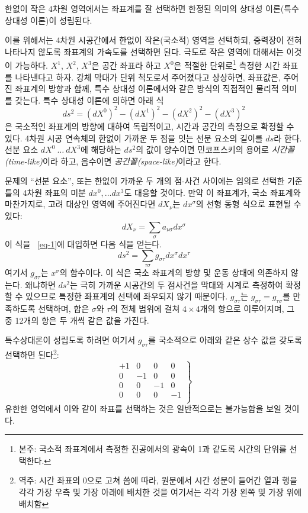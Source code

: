 한없이 작은 4차원 영역에서는 좌표계를 잘 선택하면 한정된 의미의 상대성 이론(특수 상대성 이론)이 성립된다.

이를 위해서는 4차원 시공간에서 한\-없이 작은(국소적) 영역을 선택하되, 중력장이 전혀 나타나지 않도록 좌표계의 가속도를 선택하면 된다. 극도로 작은 영역에 대해서는 이것이 가능하다. $X^1$, $X^2$, $X^3$은 공간 좌표라 하고 $X^0$은 적절한 단위로\footnote{본주: 국소적 좌표계에서 측정한 진공에서의 광속이 1과 같도록 시간의 단위를 선택한다.}  측정한 시간 좌표를 나타낸다고 하자. 강체 막대가 단위 척도로서 주어졌다고 상상하면, 좌표값은, 주어진 좌표계의 방향과 함께, 특수 상대성 이론에서와 같은 방식의 직접적인 물리적 의미를 갖는다. 특수 상대성 이론에 의하면 아래 식
\begin{equation} \label{eq-1}
	ds^2 = \left(dX^0\right)^2 - \left(dX^1\right)^2 - \left(dX^2\right)^2 - \left(dX^3\right)^2
\end{equation}
은 국소적인 좌표계의 방향에 대하여 독립적이고, 시간과 공간의 측정으로 확정할 수 있다. 4차원 시공 연속체의 한\-없이 가까운 두 점을 잇는 선분 요소의 길이를 $ds$라 한다. 선분 요소 $dX^0~\dots~dX^3$에 해당하는 $ds^2$의 값이 양수이면 민코프스키의 용어로 \emph{시간꼴(time-like)}이라 하고, 음수이면 \emph{공간꼴(space-like)}이라고 한다.

문제의 ``선분 요소'', 또는 한없이 가까운 두 개의 점-사건 사이에는 임의로 선택한 기준틀의 4차원 좌표의 미분 $ dx^0,\dots dx^3  $도 대응할 것이다. 만약 이 좌표계가, 국소 좌표계와 마찬가지로, 고려 대상인 영역에 주어진다면 $dX_\nu$는 $dx^\sigma$의 선형 동형 식으로 표현될 수 있다:
\begin{equation} \label{eq-2} dX_{\nu} = \sum_{\sigma} a_{\nu\sigma}dx^{\sigma}\end{equation}
이 식을 ~\eqref{eq-1}에 대입하면 다음 식을 얻는다.
\begin{equation} \label{eq-3} ds^2 = \sum_{\tau\sigma} g_{\sigma\tau} dx^{\sigma} dx^{\tau}\end{equation}
여기서 $g_{\sigma\tau}$는 $x^\sigma$의 함수이다. 이 식은 국소 좌표계의 방향 및 운동 상태에 의존하지 않는다. 왜냐하면 $ds^2$는 극히 가까운 시공간의 두 점사건을 막대와 시계로 측정하여 확정할 수 있으므로 특정한 좌표계의 선택에 좌우되지 않기 때문이다. 
$g_{\sigma\tau}$는 $g_{\sigma\tau}=g_{\tau\sigma}$를 만족하도록 선택하며, 합은 $\sigma$와 $\tau$의 전체 범위에 걸쳐 $4\times4$개의 항으로 이루어지며, 그 중 12개의 항은 두 개씩 같은 값을 가진다.\par
특수상대론이 성립도록 하려면 여기서 $g_{\sigma\tau}$를 국소적으로 아래와 같은 상수 값을 갖도록 선택하면 된다\footnote{역주: 시간 좌표의 \Index\을 0으로 고쳐 씀에 따라, 원문에서 시간 성분이 들어간 열과 행을 각각 가장 우측 및 가장 아래에 배치한 것을 여기서는 각각 가장 왼쪽 및 가장 위에 배치함}: 
\begin{equation} \label{eq-4}
	\left.\begin{array}{cccc}
		+1 & 0 & 0 & 0 \\
		0 & -1 & 0 & 0 \\
		0 & 0 & -1 & 0 \\
		0 & 0 & 0 & -1 \\
	\end{array}\right\} \end{equation}
유한한 영역에서 이와 같이 좌표를 선택하는 것은 일반적으로는 불가능함을 보일 것이다.

